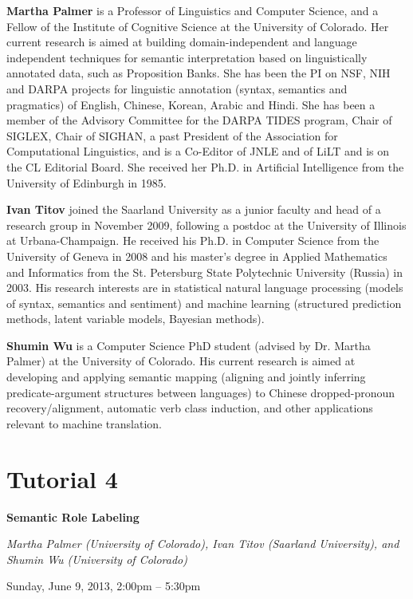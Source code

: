 \begin{bio}
\setlength{\parskip}{1ex}

\noindent
{\bfseries Martha Palmer} is a Professor of Linguistics and Computer Science, and a Fellow of the Institute of Cognitive Science at the University of Colorado. Her current research is aimed at building domain-independent and language independent techniques for semantic interpretation based on linguistically annotated data, such as Proposition Banks. She has been the PI on NSF, NIH and DARPA projects for linguistic annotation (syntax, semantics and pragmatics) of English, Chinese, Korean, Arabic and Hindi. She has been a member of the Advisory Committee for the DARPA TIDES program, Chair of SIGLEX, Chair of SIGHAN, a past President of the Association for Computational Linguistics, and is a Co-Editor of JNLE and of LiLT and is on the CL Editorial Board. She received her Ph.D. in Artificial Intelligence from the University of Edinburgh in 1985.

\noindent
{\bfseries Ivan Titov} joined the Saarland University as a junior faculty and head of a research group in November 2009, following a postdoc at the University of Illinois at Urbana-Champaign. He received his Ph.D. in Computer Science from the University of Geneva in 2008 and his master's degree in Applied Mathematics and Informatics from the St. Petersburg State Polytechnic University (Russia) in 2003. His research interests are in statistical natural language processing (models of syntax, semantics and sentiment) and machine learning (structured prediction methods, latent variable models, Bayesian methods).

\noindent
{\bfseries Shumin Wu} is a Computer Science PhD student (advised by Dr. Martha Palmer) at the University of Colorado. His current research is aimed at developing and applying semantic mapping (aligning and jointly inferring predicate-argument structures between languages) to Chinese dropped-pronoun recovery/alignment, automatic verb class induction, and other applications relevant to machine translation.
\end{bio}

\section%
    [\textbf{T4:} Semantic Role Labeling (M. Palmer, I. Titov and S. Wu)]
    {Tutorial 4}
\label{TutD}
\begin{center}
\begin{Large}
\bfseries Semantic Role Labeling\\ \vspace{2em}\par
\end{Large}

{\itshape Martha Palmer (University of Colorado), Ivan Titov (Saarland University), and Shumin Wu (University of Colorado)}\vspace{1em}\par
Sunday, June 9, 2013, 2:00pm -- 5:30pm \vspace{1em}\\
\TutLocD
\end{center}

